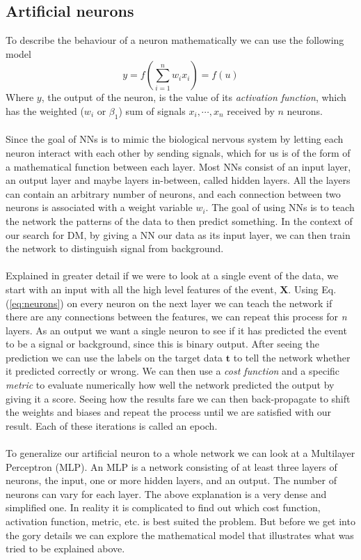 \documentclass[14pt, a4paper]{book}
\begin{document}
\subsection{Artificial neurons}
To describe the behaviour of a neuron mathematically we can use the following model
\begin{equation}\label{eq:neurons}
    y=f\left(\sum_{i=1}^{n}w_ix_i\right)=f(u)
\end{equation}
Where $y$, the output of the neuron, is the value of its \textit{activation function}, which has the weighted ($w_i$ or $\beta_1$) sum of signals $x_i,\cdots,x_n$ received by $n$ neurons.\\
\\Since the goal of NNs is to mimic the biological nervous system by letting each neuron interact with each other by sending signals, which for us is of the form of a mathematical function between each layer. 
Most NNs consist of an input layer, an output layer and maybe layers in-between, called hidden layers. All the layers can contain an arbitrary number of neurons, and each connection between two neurons is associated with a weight variable $w_i$.
The goal of using NNs is to teach the network the patterns of the data to then predict something. In the context of our search for DM, by giving a NN our data as its input layer, we can then train the network to distinguish signal from background.\\
\\Explained in greater detail if we were to look at a single event of the data, we start with an input with all the high level features of the event, $\bm X$. Using Eq. (\ref{eq:neurons}) on every neuron on the next layer we can teach the network if there 
are any connections between the features, we can repeat this process for \textit{n} layers. As an output we want a single neuron to see if it has predicted the event to be a signal or background, since this is binary output. After seeing the prediction we can use the labels on the target data $\bm t$ 
to tell the network whether it predicted correctly or wrong. We can then use a \textit{cost function} and a specific \textit{metric} to evaluate numerically how well the network predicted the output by giving it a score. 
Seeing how the results fare we can then back-propagate to shift the weights and biases and repeat the process until we are satisfied with our result. Each of these iterations is called an epoch.\\
\\To generalize our artificial neuron to a whole network we can look at a Multilayer Perceptron (MLP). An MLP is a network consisting of at least three layers of neurons, the input, one or more hidden layers, and an output. 
The number of neurons can vary for each layer. The above explanation is a very dense and simplified one. In reality it is complicated to find out which cost function, activation function, metric, etc. is best suited the problem. 
But before we get into the gory details we can explore the mathematical model that illustrates what was tried to be explained above. 
\end{document}
